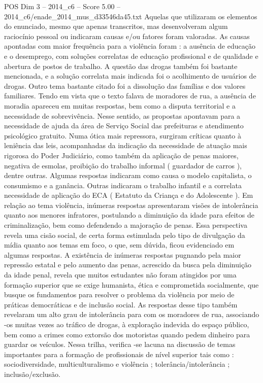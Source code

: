 \begin{textsample}{POS Dim 3 – 2014\_c6 – Score 5.00 – 2014\_c6/enade\_2014\_mus\_d33546da45.txt}
Aquelas que utilizaram os elementos do enunciado, mesmo que apenas transcritos, mas desenvolveram algum raciocínio pessoal ou indicaram causas e/ou fatores foram valoradas.
As causas apontadas com maior frequência para a violência foram : a ausência de educação e o desemprego, com soluções correlatas de educação profissional e de qualidade e abertura de postos de trabalho.
A questão das drogas também foi bastante mencionada, e a solução correlata mais indicada foi o acolhimento de usuários de drogas.
Outro tema bastante citado foi a dissolução das famílias e dos valores familiares.
Tendo em vista que o texto falava de moradores de rua, a ausência de moradia apareceu em muitas respostas, bem como a disputa territorial e a necessidade de sobrevivência.
Nesse sentido, as propostas apontavam para a necessidade de ajuda da área de Serviço Social das prefeituras e atendimento psicológico gratuito.
Numa ótica mais repressora, surgiram críticas quanto à leniência das leis, acompanhadas da indicação da necessidade de atuação mais rigorosa do Poder Judiciário, como também da aplicação de penas maiores, negativa de esmolas, proibição do trabalho informal ( guardador de carros ), dentre outras.
Algumas respostas indicaram como causa o modelo capitalista, o consumismo e a ganância.
Outras indicaram o trabalho infantil e a correlata necessidade de aplicação do ECA ( Estatuto da Criança e do Adolescente ).
Em relação ao tema violência, inúmeras respostas apresentaram visões de intolerância quanto aos menores infratores, postulando a diminuição da idade para efeitos de criminalização, bem como defendendo a majoração de penas.
Essa perspectiva revela uma cisão social, de certa forma estimulada pelo tipo de divulgação da mídia quanto aos temas em foco, o que, sem dúvida, ficou evidenciado em algumas respostas.
A existência de inúmeras respostas pugnando pela maior repressão estatal e pelo aumento das penas, acrescido da busca pela diminuição da idade penal, revela que muitos estudantes não foram atingidos por uma formação superior que se exige humanista, ética e comprometida socialmente, que busque os fundamentos para resolver o problema da violência por meio de práticas democráticas e de inclusão social.
As respostas desse tipo também revelaram um alto grau de intolerância para com os moradores de rua, associando -os muitas vezes ao tráfico de drogas, à exploração indevida do espaço público, bem como a crimes como extorsão dos motoristas quando pedem dinheiro para guardar os veículos.
Nessa trilha, verifica -se lacuna na discussão de temas importantes para a formação de profissionais de nível superior tais como : sociodiversidade, multiculturalismo e violência ; tolerância/intolerância ; inclusão/exclusão.

\end{textsample}
